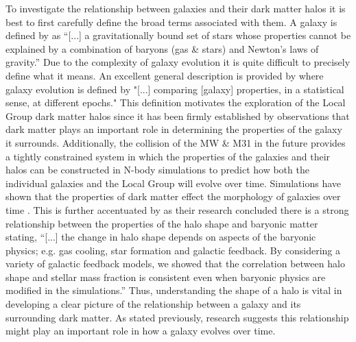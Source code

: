 \documentclass[fleqn,usenatbib]{mnras}
\begin{document}
 \hspace{6mm}To investigate the relationship between galaxies and their dark matter halos it is best to first carefully define the broad terms associated with them. A galaxy is defined by \cite{Willman12} as ``[...] a gravitationally bound set of stars whose properties cannot be explained by a combination of baryons (gas \& stars) and Newton's laws of gravity.'' Due to the complexity of galaxy evolution it is quite difficult to precisely define what it means. An excellent general description is provided by \cite{Mo10} where galaxy evolution is defined by "[...] comparing [galaxy] properties, in a statistical sense, at different epochs." This definition motivates the exploration of the Local Group dark matter halos since it has been firmly established by observations that dark matter plays an important role in determining the properties of the galaxy it surrounds. Additionally, the collision of the MW \& M31 in the future provides a tightly constrained system in which the properties of the galaxies and their halos can be constructed in N-body simulations to predict how both the individual galaxies and the Local Group will evolve over time. Simulations have shown that the properties of dark matter effect the morphology of galaxies over time \citep{Cataldi21}. This is further accentuated by \cite{Chua22} as their research concluded there is a strong relationship between the properties of the halo shape and baryonic matter stating, ``[...] the change in halo shape depends on aspects of the baryonic physics; e.g. gas cooling, star formation and galactic feedback. By considering a variety of galactic feedback models, we showed that the correlation between halo shape and stellar mass fraction is consistent even when baryonic physics are modified in the simulations.'' Thus, understanding the shape of a halo is vital in developing a clear picture of the relationship between a galaxy and its surrounding dark matter. As stated previously, research suggests this relationship might play an important role in how a galaxy evolves over time.    
\end{document}
